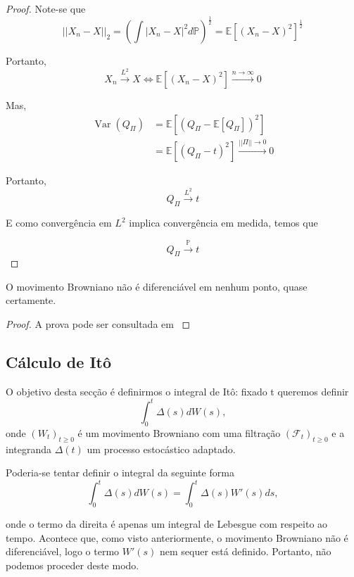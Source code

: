 \documentclass{article}
\begin{document}
\begin{proof}
    Note-se que $$||X_n-X||_2=\left(\int|X_n-X|^2d\mathbb{P} \right)^\frac{1}{2}=\mathbb{E}[(X_n-X)^2]^\frac{1}{2}$$
    
    Portanto, $$X_n \overset{L^2}{\rightarrow}X \Leftrightarrow \mathbb{E}[(X_n-X)^2] \overset{n \rightarrow \infty}{\longrightarrow}0$$
    
    Mas,
    \begin{align*}
        \operatorname{Var}(Q_\Pi)&=\mathbb{E}[(Q_\Pi-\mathbb{E}[Q_\Pi])^2]\\
                                 &=\mathbb{E}[(Q_\Pi-t)^2] \overset{||\Pi|| \rightarrow 0}{\longrightarrow} 0
    \end{align*}

    Portanto, $$Q_\Pi \overset{L^2}{\longrightarrow}t$$

    E como convergência em $L^2$ implica convergência em medida, temos que 

    $$Q_\Pi \overset{\mathbb{P}}{\longrightarrow}t$$
\end{proof}

\begin{prop}
    O movimento Browniano não é diferenciável em nenhum ponto, quase certamente.
\end{prop}
\begin{proof}
    A prova pode ser consultada em \cite{Rostek2009}
\end{proof}


\vspace{1cm}
\subsection{Cálculo de Itô}

O objetivo desta secção é definirmos o integral de Itô: fixado t queremos definir
\begin{equation*}
    \int_0^t\Delta(s)dW(s),
\end{equation*}
onde $(W_t)_{t\geq 0}$ é um movimento Browniano com uma filtração $(\mathcal{F}_t)_{t \geq 0}$ e a integranda $\Delta(t)$ um processo estocástico adaptado.

Poderia-se tentar definir o integral da seguinte forma
\begin{equation*}
    \int_0^t\Delta(s)dW(s)=\int_0^t\Delta(s)W'(s)ds,
\end{equation*}

onde o termo da direita é apenas um integral de Lebesgue com respeito ao tempo. Acontece que, como visto anteriormente, o movimento Browniano não é diferenciável, logo o termo $W'(s)$ nem sequer está definido. Portanto, não podemos proceder deste modo.
\end{document}
